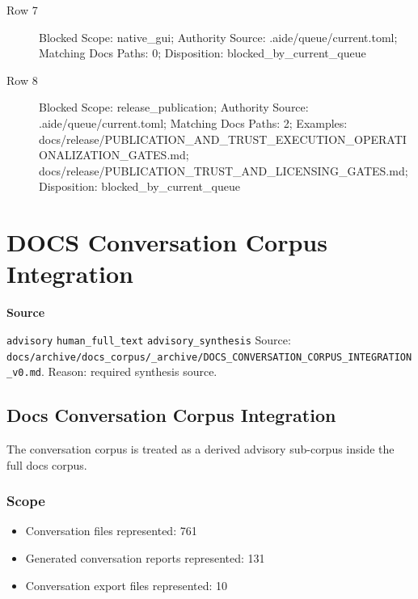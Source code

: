 \documentclass[9pt,a4paper,openany]{book}
\newcommand{\vonecallout}[3]{\par\medskip\noindent\begingroup\setlength{\fboxsep}{7pt}\colorbox{DomCalloutBg}{\parbox{0.94\linewidth}{\textbf{\textcolor{#1}{#2}}\par #3}}\endgroup\par\medskip}
\begin{document}
\begin{description}
\item[Row 7] Blocked Scope: native\_\allowbreak{}gui; Authority Source: .\allowbreak{}aide/\allowbreak{}queue/\allowbreak{}current.\allowbreak{}toml; Matching Docs Paths: 0; Disposition: blocked\_\allowbreak{}by\_\allowbreak{}current\_\allowbreak{}queue
\item[Row 8] Blocked Scope: release\_\allowbreak{}publication; Authority Source: .\allowbreak{}aide/\allowbreak{}queue/\allowbreak{}current.\allowbreak{}toml; Matching Docs Paths: 2; Examples: docs/\allowbreak{}release/\allowbreak{}PUBLICATION\_\allowbreak{}AND\_\allowbreak{}TRUST\_\allowbreak{}EXECUTION\_\allowbreak{}OPERATIONALIZATION\_\allowbreak{}GATES.\allowbreak{}md; docs/\allowbreak{}release/\allowbreak{}PUBLICATION\_\allowbreak{}TRUST\_\allowbreak{}AND\_\allowbreak{}LICENSING\_\allowbreak{}GATES.\allowbreak{}md; Disposition: blocked\_\allowbreak{}by\_\allowbreak{}current\_\allowbreak{}queue
\end{description}



\section{DOCS Conversation Corpus Integration}

\vonecallout{DomSlate}{Source}{\texttt{advisory} \texttt{human\_\allowbreak{}full\_\allowbreak{}text} \texttt{advisory\_\allowbreak{}synthesis} Source: \texttt{docs/\allowbreak{}archive/\allowbreak{}docs\_\allowbreak{}corpus/\allowbreak{}\_\allowbreak{}archive/\allowbreak{}DOCS\_\allowbreak{}CONVERSATION\_\allowbreak{}CORPUS\_\allowbreak{}INTEGRATION\_\allowbreak{}v0.\allowbreak{}md}.\allowbreak{} Reason: required synthesis source.\allowbreak{}}

\subsection{Docs Conversation Corpus Integration}

The conversation corpus is treated as a derived advisory sub-\allowbreak{}corpus inside the full docs corpus.\allowbreak{}


\subsubsection{Scope}

\begin{itemize}
\item Conversation files represented: 761
\item Generated conversation reports represented: 131
\item Conversation export files represented: 10
\end{itemize}
\end{document}
